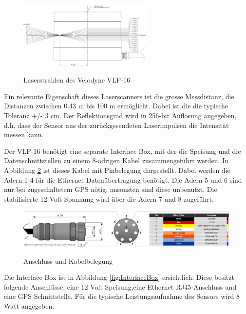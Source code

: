 \begin{figure}[H]
	\centering
	\includegraphics[width=0.6\textwidth]
	{resources/velodyne_channels.PNG}
	\caption[Laserstrahlen des Velodyne  VLP-16]{Laserstrahlen des Velodyne  VLP-16} \protect\cite{velodyne}
	\label{fig:angleVLP}
\end{figure}

Ein relevante Eigenschaft dieses Laserscanners ist die grosse Messdistanz, die Distanzen zwischen 0.43 m bis 100 m ermöglicht. Dabei ist die die typische Toleranz +/- 3 cm. Der Reflektionsgrad wird in 256-bit Auflösung angegeben, d.h. dass der Sensor aus der zurückgesendeten Laserimpulsen die Intensität messen kann.

Der VLP-16 benötigt eine separate Interface Box, mit der die Speisung und die Datenschnittstellen zu einem 8-adrigen Kabel zusammengeführt werden. In Abbildung \ref{fig:CablePin} ist dieses Kabel mit Pinbelegung dargestellt. Dabei werden die Adern 1-4 für die Ethernet Datenübertragung benötigt. Die Adern 5 und 6 sind nur bei zugeschaltetem \ac{GPS} nötig, ansonsten sind diese unbenutzt. Die stabilisierte 12 Volt Spannung wird über die Adern 7 und 8 zugeführt.

\begin{figure}[H]
	\centering
	\includegraphics[width=1\textwidth]{resources/Cablepins.PNG}
	\caption[Anschluss und Kabelbelegung]{Anschluss und Kabelbelegung}\protect\cite{velodyne}
	\label{fig:CablePin}
\end{figure} 

Die Interface Box ist in Abbildung \ref{fig:InterfaceBox} ersichtlich. Diese besitzt folgende Anschlüsse; eine 12 Volt Speisung,eine Ethernet RJ45-Anschluss und eine \ac{GPS} Schnittstelle. Für die typische Leistungsaufnahme des Sensors wird 8 Watt angegeben. 

